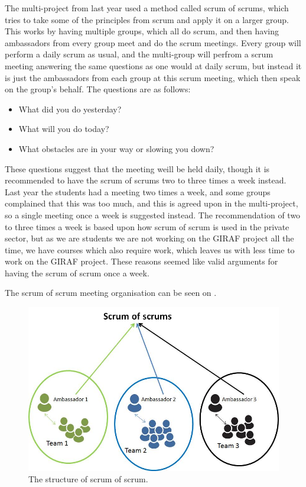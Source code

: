 \bigskip
The multi-project from last year used a method called scrum of scrums, which tries to take some of the principles from scrum and apply it on a larger group.
This works by having multiple groups, which all do scrum, and then having ambassadors from every group meet and do the scrum meetings. 
Every group will perform a daily scrum as usual, and the multi-group will perfrom a scrum meeting answering the same questions as one would at daily scrum, but instead it is just the ambassadors from each group at this scrum meeting, which then speak on the group's behalf.
The questions are as follows:

\begin{itemize}
	\item What did you do yesterday? 
	\item What will you do today?
	\item What obstacles are in your way or slowing you down?
\end{itemize}

These questions suggest that the meeting weill be held daily, though it is recommended to have the scrum of scrums two to three times a week instead.
Last year the students had a meeting two times a week, and some groups complained that this was too much, and this is agreed upon in the multi-project, so a single meeting once a week is suggested instead.
The recommendation of two to three times a week is based upon how scrum of scrum is used in the private sector, but as we are students we are not working on the GIRAF project all the time, we have courses which also require work, which leaves us with less time to work on the GIRAF project. 
These reasons seemed like valid arguments for having the scrum of scrum once a week.

The scrum of scrum meeting organisation can be seen on .

\begin{figure}
\centering
\includegraphics[scale=0.4]{figures/scrumofscrum.png}
\caption{The structure of scrum of scrum.}
\label{fig:scrumofscrum}
\end{figure}

